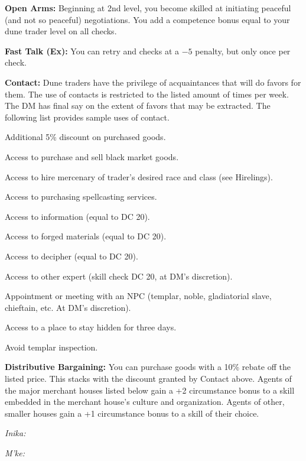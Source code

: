 \textbf{Open Arms:} Beginning at 2nd level, you become skilled at initiating peaceful (and not so peaceful) negotiations. You add a competence bonus equal to \onehalf your dune trader level on all  checks.

\textbf{Fast Talk (Ex):} You can retry  and  checks at a $-5$ penalty, but only once per check.

\textbf{Contact:} Dune traders have the privilege of acquaintances that will do favors for them. The use of contacts is restricted to the listed amount of times per week. The DM has final say on the extent of favors that
may be extracted. The following list provides sample uses
of contact.

\begin{itemize*}
\item Additional 5\% discount on purchased goods.
\item Access to purchase and sell black market goods.
\item Access to hire mercenary of trader's desired race and class (see Hirelings).
\item Access to purchasing spellcasting services.
\item Access to information (equal to  DC 20).
\item Access to forged materials (equal to  DC 20).
\item Access to decipher (equal to  DC 20).
\item Access to other expert (skill check DC 20, at DM's discretion).
\item Appointment or meeting with an NPC (templar, noble, gladiatorial slave, chieftain, etc. At DM's discretion).
\item Access to a place to stay hidden for three days.
\item Avoid templar inspection.
\end{itemize*}

\textbf{Distributive Bargaining:} You can purchase goods with a 10\% rebate off the listed price. This stacks with the discount granted by Contact above. Agents of the major merchant houses listed below gain a +2 circumstance bonus to a skill embedded in the merchant house’s culture and organization. Agents of other, smaller houses gain a +1 circumstance bonus to a skill of their choice.

\textit{Inika:} 

\textit{M’ke:} 

